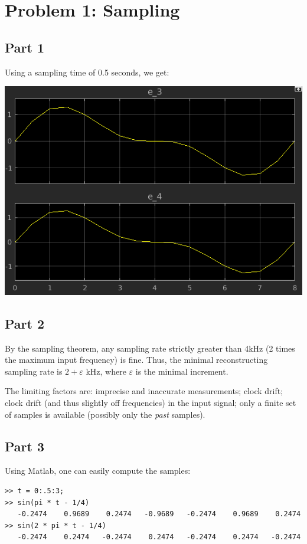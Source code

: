 \documentclass[a4paper,parskip,headheight=38pt]{scrartcl} %
\begin{document}
\section*{Problem 1: Sampling}

\subsection*{Part 1}

Using a sampling time of 0.5 seconds, we get:

\includegraphics[width=\textwidth]{p1a-proof}

\subsection*{Part 2}

By the sampling theorem, any sampling rate strictly greater than 4kHz
(2 times the maximum input frequency) is fine.  Thus, the minimal
reconstructing sampling rate is $2 + \varepsilon$ kHz, where
$\varepsilon$ is the minimal increment.

The limiting factors are: imprecise and inaccurate measurements; clock
drift; clock drift (and thus slightly off frequencies) in the input
signal; only a finite set of samples is available (possibly only the
\emph{past} samples).

\subsection*{Part 3}

Using Matlab, one can easily compute the samples:
\begin{verbatim}
>> t = 0:.5:3;
>> sin(pi * t - 1/4)
   -0.2474    0.9689    0.2474   -0.9689   -0.2474    0.9689    0.2474
>> sin(2 * pi * t - 1/4)
   -0.2474    0.2474   -0.2474    0.2474   -0.2474    0.2474   -0.2474
\end{verbatim}
\end{document}
